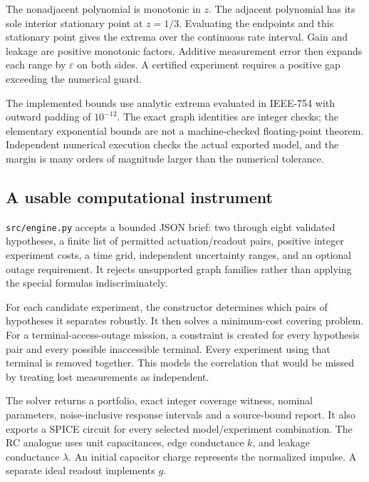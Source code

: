 \documentclass[
  11pt,
]{article}
\begin{document}
The nonadjacent polynomial is monotonic in \(z\). The adjacent
polynomial has its sole interior stationary point at \(z=1/3\).
Evaluating the endpoints and this stationary point gives the extrema
over the continuous rate interval. Gain and leakage are positive
monotonic factors. Additive measurement error then expands each range by
\(\varepsilon\) on both sides. A certified experiment requires a
positive gap exceeding the numerical guard.

The implemented bounds use analytic extrema evaluated in IEEE-754 with
outward padding of \(10^{-12}\). The exact graph identities are integer
checks; the elementary exponential bounds are not a machine-checked
floating-point theorem. Independent numerical execution checks the
actual exported model, and the margin is many orders of magnitude larger
than the numerical tolerance.

\hypertarget{a-usable-computational-instrument}{%
\subsection{A usable computational
instrument}\label{a-usable-computational-instrument}}

\texttt{src/engine.py} accepts a bounded JSON brief: two through eight
validated hypotheses, a finite list of permitted actuation/readout
pairs, positive integer experiment costs, a time grid, independent
uncertainty ranges, and an optional outage requirement. It rejects
unsupported graph families rather than applying the special formulas
indiscriminately.

For each candidate experiment, the constructor determines which pairs of
hypotheses it separates robustly. It then solves a minimum-cost covering
problem. For a terminal-access-outage mission, a constraint is created
for every hypothesis pair and every possible inaccessible terminal.
Every experiment using that terminal is removed together. This models
the correlation that would be missed by treating lost measurements as
independent.

The solver returns a portfolio, exact integer coverage witness, nominal
parameters, noise-inclusive response intervals and a source-bound
report. It also exports a SPICE circuit for every selected
model/experiment combination. The RC analogue uses unit capacitances,
edge conductance \(k\), and leakage conductance \(\lambda\). An initial
capacitor charge represents the normalized impulse. A separate ideal
readout implements \(g\).
\end{document}
